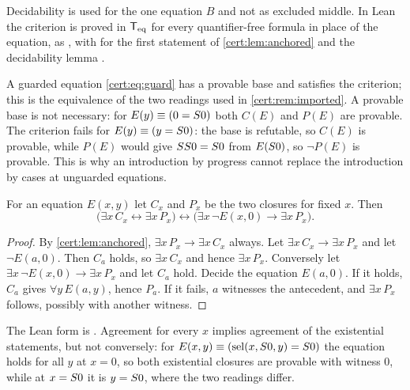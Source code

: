 Decidability is used for the one equation $B$ and not as excluded middle. In
Lean the criterion is proved in $\mathsf{T}_{\mathrm{eq}}$ for every quantifier-free formula in
place of the equation, as , with
 for the first statement of
\cref{cert:lem:anchored} and the decidability lemma .

A guarded equation \eqref{cert:eq:guard} has a provable base and satisfies the
criterion; this is the equivalence of the two readings used in
\cref{cert:rem:imported}. A provable base is not necessary: for
$E(y)\equiv(0=S 0)$ both $C(E)$ and $P(E)$ are provable. The criterion
fails for $E(y)\equiv(y=S 0)$: the base is refutable, so $C(E)$ is
provable, while $P(E)$ would give $SS 0=S 0$ from $E(S 0)$, so
$\neg P(E)$ is provable. This is why an introduction by progress cannot
replace the introduction by cases at unguarded equations.

\begin{theorem}\label{cert:thm:ex-criterion}
For an equation $E(x,y)$ let $C_x$ and $P_x$ be the two closures for fixed
$x$. Then
\[
\bigl(\exists x\,C_x\leftrightarrow\exists x\,P_x\bigr)\leftrightarrow
\bigl(\exists x\,\neg E(x,0)\to\exists x\,P_x\bigr).
\]
\end{theorem}
\begin{proof}
By \cref{cert:lem:anchored}, $\exists x\,P_x\to\exists x\,C_x$ always. Let
$\exists x\,C_x\to\exists x\,P_x$ and let $\neg E(a,0)$. Then $C_a$ holds, so
$\exists x\,C_x$ and hence $\exists x\,P_x$. Conversely let
$\exists x\,\neg E(x,0)\to\exists x\,P_x$ and let $C_a$ hold. Decide the
equation $E(a,0)$. If it holds, $C_a$ gives $\forall y\,E(a,y)$, hence $P_a$.
If it fails, $a$ witnesses the antecedent, and $\exists x\,P_x$ follows,
possibly with another witness.
\end{proof}

The Lean form is . Agreement for every
$x$ implies agreement of the existential statements, but not conversely: for
$E(x,y)\equiv(\operatorname{sel}(x,S 0,y)=S 0)$ the equation holds for all $y$ at
$x=0$, so both existential closures are provable with witness $0$, while at
$x=S 0$ it is $y=S 0$, where the two readings differ.

